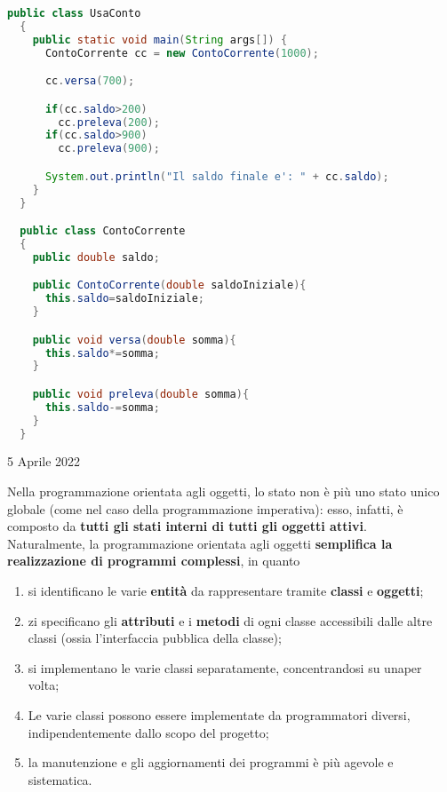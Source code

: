 \documentclass[a4paper]{extarticle}
\begin{document}
\newpage
\noindent
\begin{lstlisting}[language=Java, caption=Esempio di multiclasse in Java]
  public class UsaConto
  {
    public static void main(String args[]) {
      ContoCorrente cc = new ContoCorrente(1000);

      cc.versa(700);

      if(cc.saldo>200)
        cc.preleva(200);
      if(cc.saldo>900)
        cc.preleva(900);

      System.out.println("Il saldo finale e': " + cc.saldo);
    }
  }

  public class ContoCorrente
  {
    public double saldo;

    public ContoCorrente(double saldoIniziale){
      this.saldo=saldoIniziale;
    }

    public void versa(double somma){
      this.saldo*=somma;
    }

    public void preleva(double somma){
      this.saldo-=somma;
    }
  }
\end{lstlisting}

\newpage
\noindent
\begin{center}
  5 Aprile 2022
\end{center}
Nella programmazione orientata agli oggetti, lo stato non è più uno stato unico globale (come nel caso della programmazione imperativa): esso, infatti, è composto da \textbf{tutti gli stati interni di tutti gli oggetti attivi}.\\
Naturalmente, la programmazione orientata agli oggetti \textbf{semplifica la realizzazione di programmi complessi}, in quanto
\begin{enumerate}
  \item si identificano le varie \textbf{entità} da rappresentare tramite \textbf{classi} e \textbf{oggetti};
  \item zi specificano gli \textbf{attributi} e i \textbf{metodi} di ogni classe accessibili dalle altre classi (ossia l’interfaccia pubblica della classe);
  \item si implementano le varie classi separatamente, concentrandosi su unaper volta;
  \item Le varie classi possono essere implementate da programmatori diversi, indipendentemente dallo scopo del progetto;
  \item la manutenzione e gli aggiornamenti dei programmi è più agevole e sistematica.
\end{enumerate}

\vspace{1em}
\noindent
\end{document}
